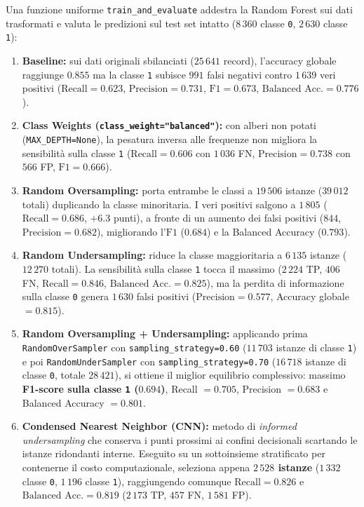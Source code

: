 Una funzione uniforme \texttt{train\_and\_evaluate} addestra la Random Forest sui dati trasformati e valuta le predizioni sul test set intatto ($8\,360$ classe \texttt{0}, $2\,630$ classe \texttt{1}):
\begin{enumerate}
    \item \textbf{Baseline:} sui dati originali sbilanciati ($25\,641$ record), l'accuracy globale raggiunge $0.855$ ma la classe \texttt{1} subisce $991$ falsi negativi contro $1\,639$ veri positivi ($\text{Recall} = 0.623$, $\text{Precision} = 0.731$, $\text{F1} = 0.673$, $\text{Balanced Acc.} = 0.776$).
    \item \textbf{Class Weights (\texttt{class\_weight="balanced"}):} con alberi non potati (\texttt{MAX\_DEPTH=None}), la pesatura inversa alle frequenze non migliora la sensibilit\`a sulla classe \texttt{1} ($\text{Recall} = 0.606$ con $1\,036$ FN, $\text{Precision} = 0.738$ con $566$ FP, $\text{F1} = 0.666$).
    \item \textbf{Random Oversampling:} porta entrambe le classi a $19\,506$ istanze ($39\,012$ totali) duplicando la classe minoritaria. I veri positivi salgono a $1\,805$ ($\text{Recall} = 0.686$, $+6.3$ punti), a fronte di un aumento dei falsi positivi ($844$, $\text{Precision} = 0.682$), migliorando l'$\text{F1}$ ($0.684$) e la Balanced Accuracy ($0.793$).
    \item \textbf{Random Undersampling:} riduce la classe maggioritaria a $6\,135$ istanze ($12\,270$ totali). La sensibilit\`a sulla classe \texttt{1} tocca il massimo ($2\,224$ TP, $406$ FN, $\text{Recall} = 0.846$, $\text{Balanced Acc.} = 0.825$), ma la perdita di informazione sulla classe \texttt{0} genera $1\,630$ falsi positivi ($\text{Precision} = 0.577$, Accuracy globale $= 0.815$).
    \item \textbf{Random Oversampling + Undersampling:} applicando prima \texttt{RandomOverSampler} con \texttt{sampling\_strategy=0.60} ($11\,703$ istanze di classe \texttt{1}) e poi \texttt{RandomUnderSampler} con \texttt{sampling\_strategy=0.70} ($16\,718$ istanze di classe \texttt{0}, totale $28\,421$), si ottiene il miglior equilibrio complessivo: massimo \textbf{F1-score sulla classe \texttt{1} ($0.694$)}, Recall $= 0.705$, Precision $= 0.683$ e Balanced Accuracy $= 0.801$.
    \item \textbf{Condensed Nearest Neighbor (CNN):} metodo di \textit{informed undersampling} che conserva i punti prossimi ai confini decisionali scartando le istanze ridondanti interne. Eseguito su un sottoinsieme stratificato per contenerne il costo computazionale, seleziona appena \textbf{$2\,528$ istanze} ($1\,332$ classe \texttt{0}, $1\,196$ classe \texttt{1}), raggiungendo comunque $\text{Recall} = 0.826$ e $\text{Balanced Acc.} = 0.819$ ($2\,173$ TP, $457$ FN, $1\,581$ FP).
\end{enumerate}

